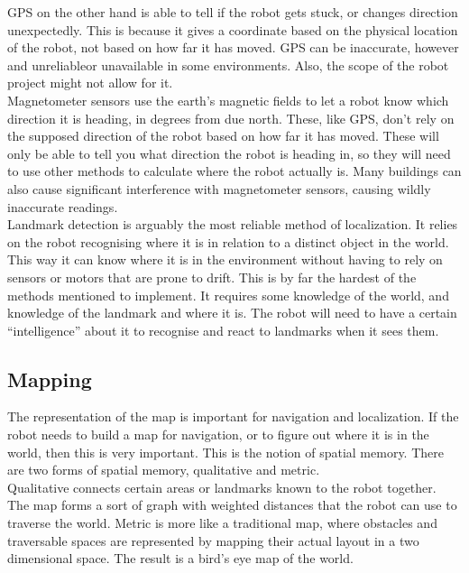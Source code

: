 \documentclass[12pt]{article}
\begin{document}
GPS on the other hand is able to tell if the robot gets stuck, or changes direction unexpectedly. This is because it gives a coordinate based on the physical location of the robot, not based on how far it has moved. GPS can be inaccurate, however and unreliableor unavailable in some environments. Also, the scope of the robot project might not allow for it.\\

Magnetometer sensors use the earth’s magnetic fields to let a robot know which direction it is heading, in degrees from due north. These, like GPS, don’t rely on the supposed direction of the robot based on how far it has moved. These will only be able to tell you what direction the robot is heading in, so they will need to use other methods to calculate where the robot actually is. Many buildings can also cause significant interference with magnetometer sensors, causing wildly inaccurate readings.\\

Landmark detection is arguably the most reliable method of localization. It relies on the robot recognising where it is in relation to a distinct object in the world. This way it can know where it is in the environment without having to rely on sensors or motors that are prone to drift. This is by far the hardest of the methods mentioned to implement. It requires some knowledge of the world, and knowledge of the landmark and where it is. The robot will need to have a certain “intelligence” about it to recognise and react to landmarks when it sees them.


	\subsection{Mapping}
The representation of the map is important for navigation and localization. If the robot needs to build a map for navigation, or to figure out where it is in the world, then this is very important. This is the notion of spatial memory. There are two forms of spatial memory, qualitative and metric.
\\
Qualitative connects certain areas or landmarks known to the robot together. The map forms a sort of graph with weighted distances that the robot can use to traverse the world. Metric is more like a traditional map, where obstacles and traversable spaces are represented by mapping their actual layout in a two dimensional space. The result is a bird’s eye map of the world. 
\end{document}
